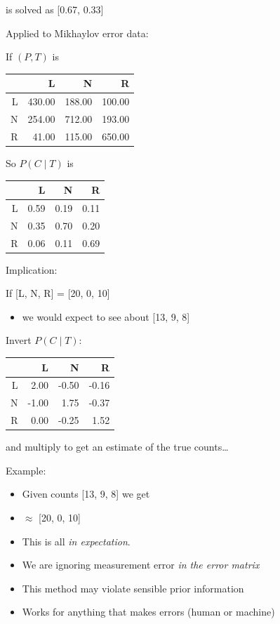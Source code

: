 \documentclass[11pt,compress,professionalfonts]{beamer}
\newcommand{\ita}{\begin{itemize}}
\newcommand{\itm}{\item[]}
\newcommand{\itz}{\end{itemize}}
\begin{document}
is solved as [0.67, 0.33]


Applied to Mikhaylov error data:

If $(P, T)$ is

\begin{tabular}{rrrr}
  \hline
 & L & N & R \\ 
  \hline
L & 430.00 & 188.00 & 100.00 \\ 
  N & 254.00 & 712.00 & 193.00 \\ 
  R & 41.00 & 115.00 & 650.00 \\ 
   \hline
\end{tabular}

\newpage 

So $P(C \mid T)$ is

\begin{tabular}{rrrr}
  \hline
 & L & N & R \\ 
  \hline
L & 0.59 & 0.19 & 0.11 \\ 
  N & 0.35 & 0.70 & 0.20 \\ 
  R & 0.06 & 0.11 & 0.69 \\ 
   \hline
\end{tabular}

Implication:

If [L, N, R] = [20, 0, 10] 
\ita
\itm we would expect to see about [13, 9, 8]
\itz

\newpage 
Invert $P(C \mid T)$:

\begin{tabular}{rrrr}
  \hline
 & L & N & R \\ 
  \hline
L & 2.00 & -0.50 & -0.16 \\ 
  N & -1.00 & 1.75 & -0.37 \\ 
  R & 0.00 & -0.25 & 1.52 \\ 
   \hline
\end{tabular}

and multiply to get an estimate of the true counts\ldots

Example: 
\ita
\itm Given counts [13, 9, 8] we get 
\itm [L 20.19, -0.16,  9.98] $\approx$ [20, 0, 10]
\itz


\ita
\itm This is all \textit{in expectation}. 
\itm We are ignoring measurement error \textit{in the error matrix}
\itm This method may violate sensible prior information
\itm Works for anything that makes errors (human or machine)
\itz
\end{document}
